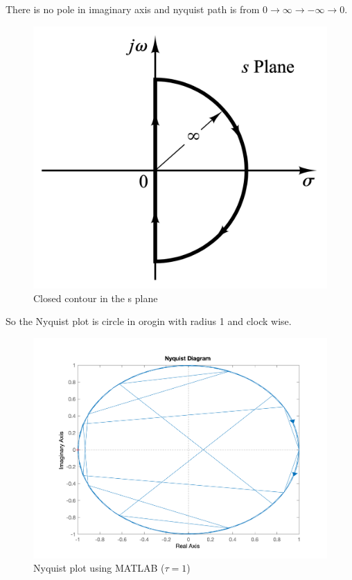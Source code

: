 There is no pole in imaginary axis and nyquist path is from $0 \to \infty \to -\infty\to 0$.
\begin{figure}[H]
	\caption{Closed contour in the s plane}
	\centering
	\includegraphics[width=12cm]{../Figure/Q1/Nyquist_path.png}
\end{figure}
So the Nyquist plot is circle in orogin with radius 1 and clock wise.
\begin{figure}[H]
	\caption{Nyquist plot using MATLAB ($\tau = 1$)}
	\centering
	\includegraphics[width=12cm]{../Figure/Q1/nyquist.png}
\end{figure}
